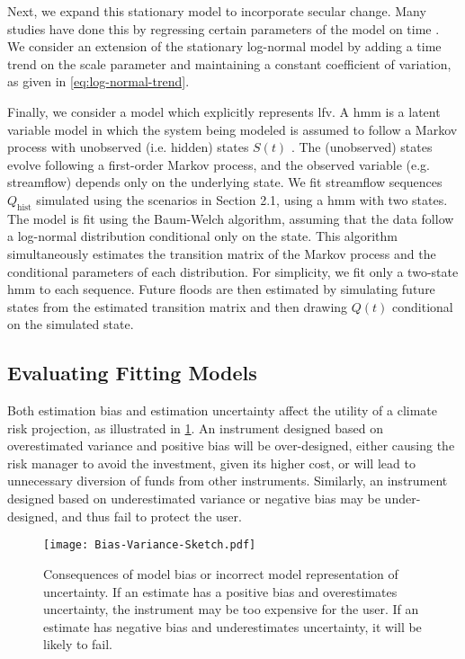 \documentclass[
]{agujournal2018}
\makeatletter
\newcommand{\eg}{e.g.\@\xspace}
\newcommand{\ie}{i.e.\@\xspace}
\makeatother
\begin{document}
Next, we expand this stationary model to incorporate secular change.
Many studies have done this by regressing certain parameters of the model on time \citep[see][]{Salas:2018ge}.
We consider an extension of the stationary log-normal model by adding a time trend on the scale parameter and maintaining a constant coefficient of variation, as given in \cref{eq:log-normal-trend}.

Finally, we consider a model which explicitly represents \acrlong{lfv}.
A \gls{hmm} is a latent variable model in which the system being modeled is assumed to follow a Markov process with unobserved (\ie hidden) states $S(t)$ \citep{Rabiner:1986jk}.
The (unobserved) states evolve following a first-order Markov process, and the observed variable (\eg streamflow) depends only on the underlying state.
We fit  streamflow sequences $Q_\text{hist}$ simulated using the scenarios in Section 2.1, using a \gls{hmm} with two states.
The model is fit using the Baum-Welch algorithm, assuming that the data follow a log-normal distribution conditional only on the state.
This algorithm simultaneously estimates the transition matrix of the Markov process and the conditional parameters of each distribution.
For simplicity, we fit only a two-state \gls{hmm} to each sequence.
Future floods are then estimated by simulating future states from the estimated transition matrix and then drawing $Q(t)$ conditional on the simulated state.

\subsection{Evaluating Fitting Models}\label{sec:methods-evaluating}

Both estimation bias and estimation uncertainty affect the utility of a climate risk projection, as illustrated in \cref{fig:conceptual-bias-variance}.
An instrument designed based on overestimated variance and positive bias will be over-designed, either causing the risk manager to avoid the investment, given its higher cost, or will lead to unnecessary diversion of funds from other instruments.
Similarly, an instrument designed based on underestimated variance or negative bias may be under-designed, and thus fail to protect the user.
\begin{figure}
  \centering
  \texttt{[image: Bias-Variance-Sketch.pdf]}
  \caption{
    Consequences of model bias or incorrect model representation of uncertainty.
    If an estimate has a positive bias and overestimates uncertainty, the instrument may be too expensive for the user.
    If an estimate has negative bias and underestimates uncertainty, it will be likely to fail.
  }\label{fig:conceptual-bias-variance}
\end{figure}
\end{document}
